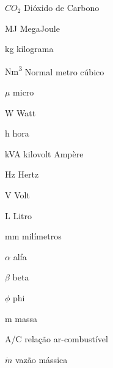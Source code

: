 \begin{simbolos}
	\item[$CO_2$] Dióxido de Carbono
	\item[MJ] MegaJoule
	\item[kg] kilograma
	\item[Nm\textsuperscript{3}] Normal metro cúbico
 	\item[$\mu$] micro
	\item[W] Watt
	\item[h] hora
	\item[kVA] kilovolt Ampère
	\item[Hz] Hertz
	\item[V] Volt
	\item[L] Litro
	\item[mm] milímetros
	\item[$\alpha$] alfa
	\item[$\beta$] beta
	\item[$\phi$] phi
	\item[m] massa
	\item[A/C] relação ar-combustível
	\item[$\dot{m}$] vazão mássica




\end{simbolos}
